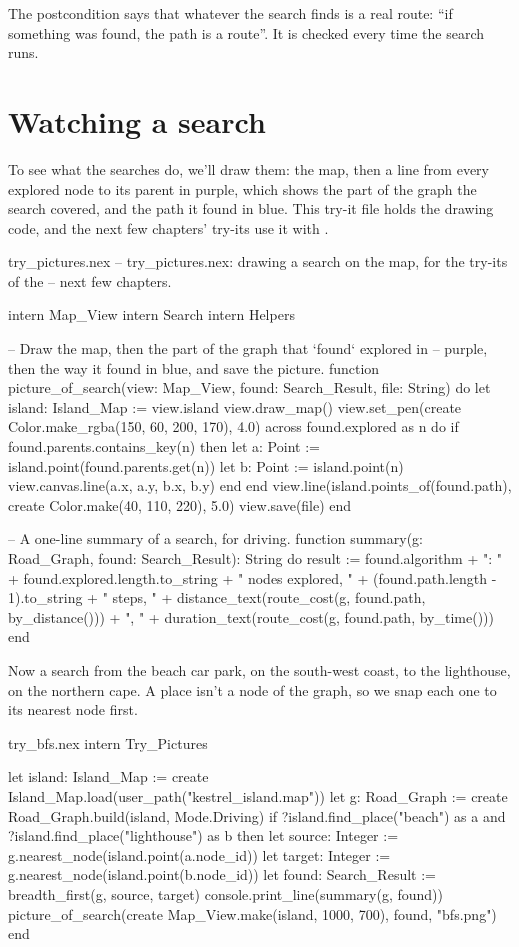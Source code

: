 The postcondition says that whatever the search finds is a real route:
``if something was found, the path is a route''. It is checked every
time the search runs.

\section{Watching a search}

To see what the searches do, we'll draw them: the map, then a line from
every explored node to its parent in purple, which shows the part of the
graph the search covered, and the path it found in blue. This try-it file
holds the drawing code, and the next few chapters' try-its use it with
.

\begin{tryit}{try_pictures.nex}
-- try_pictures.nex: drawing a search on the map, for the try-its of the
-- next few chapters.

intern Map_View
intern Search
intern Helpers

-- Draw the map, then the part of the graph that `found` explored in
-- purple, then the way it found in blue, and save the picture.
function picture_of_search(view: Map_View, found: Search_Result, file: String) do
  let island: Island_Map := view.island
  view.draw_map()
  view.set_pen(create Color.make_rgba(150, 60, 200, 170), 4.0)
  across found.explored as n do
    if found.parents.contains_key(n) then
      let a: Point := island.point(found.parents.get(n))
      let b: Point := island.point(n)
      view.canvas.line(a.x, a.y, b.x, b.y)
    end
  end
  view.line(island.points_of(found.path), create Color.make(40, 110, 220), 5.0)
  view.save(file)
end

-- A one-line summary of a search, for driving.
function summary(g: Road_Graph, found: Search_Result): String do
  result := found.algorithm + ": " + found.explored.length.to_string + " nodes explored, "
    + (found.path.length - 1).to_string + " steps, "
    + distance_text(route_cost(g, found.path, by_distance())) + ", "
    + duration_text(route_cost(g, found.path, by_time()))
end
\end{tryit}

Now a search from the beach car park, on the south-west coast, to the
lighthouse, on the northern cape. A place isn't a node of the graph, so we
snap each one to its nearest node first.

\begin{tryit}{try_bfs.nex}
intern Try_Pictures

let island: Island_Map := create Island_Map.load(user_path("kestrel_island.map"))
let g: Road_Graph := create Road_Graph.build(island, Mode.Driving)
if ?island.find_place("beach") as a and ?island.find_place("lighthouse") as b then
  let source: Integer := g.nearest_node(island.point(a.node_id))
  let target: Integer := g.nearest_node(island.point(b.node_id))
  let found: Search_Result := breadth_first(g, source, target)
  console.print_line(summary(g, found))
  picture_of_search(create Map_View.make(island, 1000, 700), found, "bfs.png")
end
\end{tryit}

